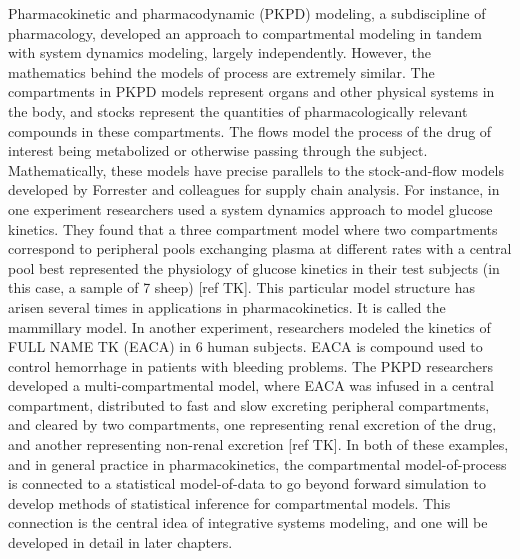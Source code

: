 Pharmacokinetic and pharmacodynamic (PKPD) modeling, a subdiscipline
of pharmacology, developed an approach to compartmental modeling in
tandem with system dynamics modeling, largely independently.  However,
the mathematics behind the models of process are extremely
similar. The compartments in PKPD models represent organs and other
physical systems in the body, and stocks represent the quantities of
pharmacologically relevant compounds in these compartments.  The flows
model the process of the drug of interest being metabolized or
otherwise passing through the subject. Mathematically, these models
have precise parallels to the stock-and-flow models developed by
Forrester and colleagues for supply chain analysis. For instance, in
one experiment researchers used a system dynamics approach to model
glucose kinetics. They found that a three compartment model where two
compartments correspond to peripheral pools exchanging plasma at
different rates with a central pool best represented the physiology of
glucose kinetics in their test subjects (in this case, a sample of 7
sheep) [ref TK]. This particular model structure has arisen several
times in applications in pharmacokinetics. It is called the mammillary
model. In another experiment, researchers modeled the kinetics of FULL
NAME TK (EACA) in 6 human subjects. EACA is compound used to control
hemorrhage in patients with bleeding problems. The PKPD researchers
developed a multi-compartmental model, where EACA was infused in a
central compartment, distributed to fast and slow excreting peripheral
compartments, and cleared by two compartments, one representing renal
excretion of the drug, and another representing non-renal excretion
[ref TK]. In both of these examples, and in general practice in
pharmacokinetics, the compartmental model-of-process is connected to a
statistical model-of-data to go beyond forward simulation to develop
methods of statistical inference for compartmental models. This
connection is the central idea of integrative systems modeling, and
one will be developed in detail in later chapters.

